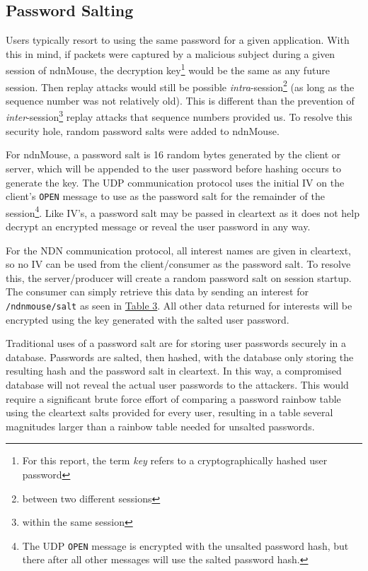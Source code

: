 \documentclass{sig-alternate}
\renewcommand\_{\textunderscore\allowbreak}  %
\begin{document}
\subsection{Password Salting}
Users typically resort to using the same password for a given application. With this in mind, if packets were captured by a malicious subject during a given session of ndnMouse, the decryption key\footnote{For this report, the term \textit{key} refers to a cryptographically hashed user password} would be the same as any future session. Then replay attacks would still be possible \textit{intra}-session\footnote{between two different sessions} (as long as the sequence number was not relatively old). This is different than the prevention of \textit{inter}-session\footnote{within the same session} replay attacks that sequence numbers provided us. To resolve this security hole, random password salts were added to ndnMouse.

For ndnMouse, a password salt is 16 random bytes generated by the client or server, which will be appended to the user password before hashing occurs to generate the key. The UDP communication protocol uses the initial IV on the client's \texttt{OPEN} message to use as the password salt for the remainder of the session\footnote{The UDP \texttt{OPEN} message is encrypted with the unsalted password hash, but there after all other messages will use the salted password hash.}. Like IV's, a password salt may be passed in cleartext as it does not help decrypt an encrypted message or reveal the user password in any way. 

For the NDN communication protocol, all interest names are given in cleartext, so no IV can be used from the client/consumer as the password salt. To resolve this, the server/producer will create a random password salt on session startup. The consumer can simply retrieve this data by sending an interest for \texttt{/ndnmouse/salt} as seen in \hyperlink{tab:ndnInterestNames}{Table 3}. All other data returned for interests will be encrypted using the key generated with the salted user password.

Traditional uses of a password salt are for storing user passwords securely in a database. Passwords are salted, then hashed, with the database only storing the resulting hash and the password salt in cleartext. In this way, a compromised database will not reveal the actual user passwords to the attackers. This would require a significant brute force effort of comparing a password rainbow table using the cleartext salts provided for every user, resulting in a table several magnitudes larger than a rainbow table needed for unsalted passwords. 
\end{document}
